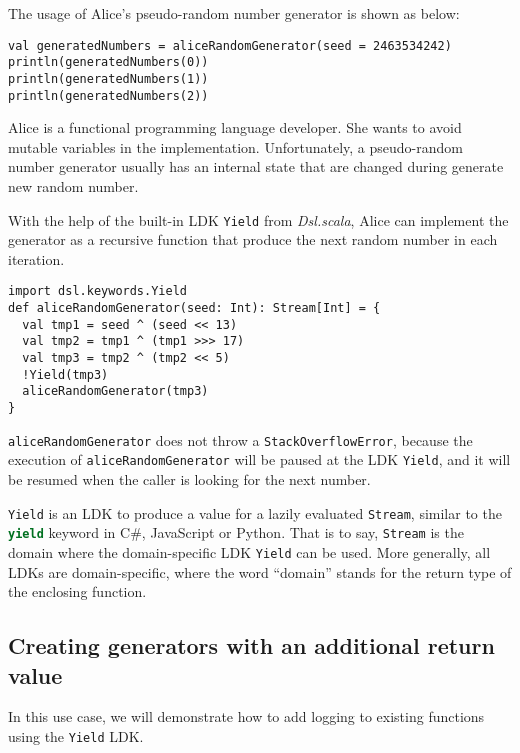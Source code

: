 The usage of Alice's pseudo-random number generator is shown as below:

\begin{lstlisting}[caption={Using Alice's pseudo-random number generator},label={generatedNumbers}]
val generatedNumbers = aliceRandomGenerator(seed = 2463534242)
println(generatedNumbers(0))
println(generatedNumbers(1))
println(generatedNumbers(2))
\end{lstlisting}

Alice is a functional programming language developer. She wants to avoid mutable variables in the implementation. Unfortunately, a pseudo-random number generator usually has an internal state that are changed during generate new random number.

With the help of the built-in LDK \lstinline{Yield} from \textit{Dsl.scala}, Alice can implement the generator as a recursive function that produce the next random number in each iteration.

\begin{lstlisting}[caption={The implementation of Alice's pseudo-random number generator},label={aliceRandomGenerator}]
import dsl.keywords.Yield
def aliceRandomGenerator(seed: Int): Stream[Int] = {
  val tmp1 = seed ^ (seed << 13)
  val tmp2 = tmp1 ^ (tmp1 >>> 17)
  val tmp3 = tmp2 ^ (tmp2 << 5)
  !Yield(tmp3)
  aliceRandomGenerator(tmp3)
}
\end{lstlisting}

\lstinline{aliceRandomGenerator} does not throw a \lstinline{StackOverflowError}, because the execution of \lstinline{aliceRandomGenerator} will be paused at the LDK \lstinline{Yield}, and it will be resumed when the caller is looking for the next number.

\lstinline{Yield} is an LDK to produce a value for a lazily evaluated \lstinline{Stream}, similar to the \lstinline[language=Python]{yield} keyword in C\#, JavaScript or Python. That is to say, \lstinline{Stream} is the domain where the domain-specific LDK \lstinline{Yield} can be used. More generally, all LDKs are domain-specific, where the word ``domain'' stands for the return type of the enclosing function.

\subsection{Creating generators with an additional return value}

In this use case, we will demonstrate how to add logging to existing functions using the \lstinline{Yield} LDK.

